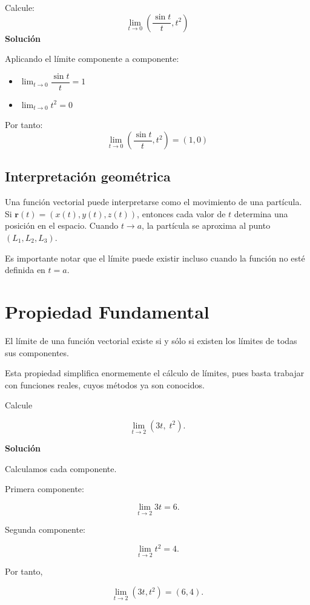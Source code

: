 \newpage

\begin{ejercicio}
Calcule:
\[ \lim_{t\to0} \left( \frac{\sin t}{t}, t^{2} \right) \]
\textbf{Solución}

Aplicando el límite componente a componente:

\begin{itemize}
    \item $ \lim_{t\to0} \dfrac{\sin t}{t}=1 $
    \item $ \lim_{t\to0}t^{2}=0 $
\end{itemize}

Por tanto:
\[ \lim_{t\to0} \left( \frac{\sin t}{t}, t^{2} \right)  = (1,0) \]
\end{ejercicio}

\subsection{Interpretación geométrica}

Una función vectorial puede interpretarse como el movimiento de una partícula. Si $ \mathbf{r}(t)= (x(t),y(t),z(t)) $, entonces cada valor de $t$ determina una posición en el espacio. Cuando $ t\rightarrow a $, la partícula se aproxima al punto $(L_1,L_2,L_3).$

Es importante notar que el límite puede existir incluso cuando la función no esté definida en $t=a$.

\section*{Propiedad Fundamental}

El límite de una función vectorial existe si y sólo si existen los límites de todas sus componentes.

Esta propiedad simplifica enormemente el cálculo de límites, pues basta trabajar con funciones reales, cuyos métodos ya son conocidos.

\newpage

\begin{ejemplo}[ ]
Calcule

\[
\lim_{t\to2}
(3t,\;t^2).
\]

\textbf{Solución}

Calculamos cada componente.

Primera componente:

\[
\lim_{t\to2}3t=6.
\]

Segunda componente:

\[
\lim_{t\to2}t^2=4.
\]

Por tanto,

\[
\boxed{
\lim_{t\to2}(3t,t^2)
=
(6,4).
}
\]
\end{ejemplo}

